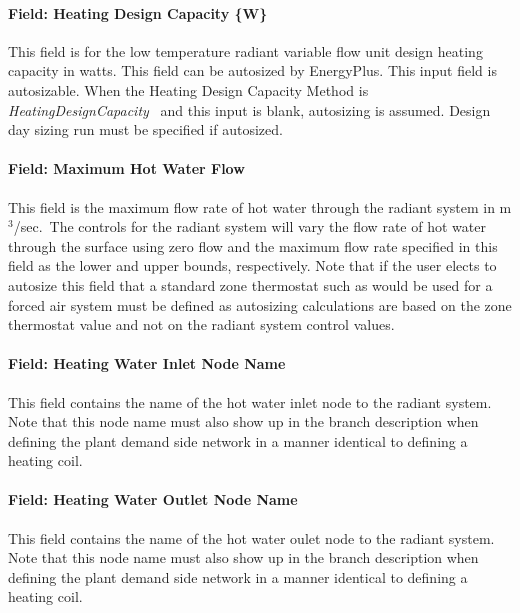 \paragraph{Field: Heating Design Capacity \{W\}}\label{field-heating-design-capacity-w-5}

This field is for the low temperature radiant variable flow unit design heating capacity in watts. This field can be autosized by EnergyPlus. This input field is autosizable. When the Heating Design Capacity Method is \emph{HeatingDesignCapacity}~ and this input is blank, autosizing is assumed. Design day sizing run must be specified if autosized.

\paragraph{Field: Maximum Hot Water Flow}\label{field-maximum-hot-water-flow}

This field is the maximum flow rate of hot water through the radiant system in m\(^{3}\)/sec.~The controls for the radiant system will vary the flow rate of hot water through the surface using zero flow and the maximum flow rate specified in this field as the lower and upper bounds, respectively. Note that if the user elects to autosize this field that a standard zone thermostat such as would be used for a forced air system must be defined as autosizing calculations are based on the zone thermostat value and not on the radiant system control values.

\paragraph{Field: Heating Water Inlet Node Name}\label{field-heating-water-inlet-node-name}

This field contains the name of the hot water inlet node to the radiant system. Note that this node name must also show up in the branch description when defining the plant demand side network in a manner identical to defining a heating coil.

\paragraph{Field: Heating Water Outlet Node Name}\label{field-heating-water-outlet-node-name}

This field contains the name of the hot water oulet node to the radiant system. Note that this node name must also show up in the branch description when defining the plant demand side network in a manner identical to defining a heating coil.

